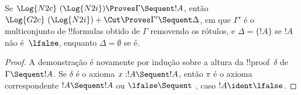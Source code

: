 \documentclass[../../../include/open-logic-section]{subfiles}
\begin{document}


\begin{prop} Se $\Log{N2c}\ (\Log{N2i}) \Proves
\Gamma \Sequent !A$, então $\Log{G2c}\ (\Log{N2i}) + \Cut \Proves \Gamma'
\Sequent \Delta$, em que $\Gamma'$ é o multiconjunto de !!{formula}s
obtido de $\Gamma$ removendo os rótulos, e $\Delta = \{!A\}$ se $!A$
não é~$\lfalse$, enquanto $\Delta = \emptyset$ se é.
\end{prop}

\begin{proof}
A demonstração é novamente por indução sobre a altura da
!!{proof}~$\delta$ de $\Gamma \Sequent !A$. Se $\delta$ é o axioma
$x:!A \Sequent !A$, então $\pi$ é o axioma correspondente $!A \Sequent !A$
ou $\lfalse \Sequent \ $, caso $!A \ident \lfalse$.


\end{proof}
\end{document}
